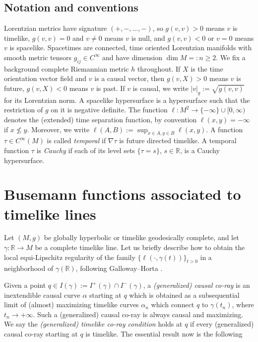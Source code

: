 \documentclass[a4paper,11pt]{article}
\numberwithin{equation}{section}
\theoremstyle{definition}
\theoremstyle{plain}
\newcommand{\R}{\mathbb R}
\begin{document}
\subsection{Notation and conventions}
\label{subsection: notation conventions}

Lorentzian metrics have signature $(+,-,\dots,-)$, so
$g(v,v) > 0$ means $v$ is timelike, $g(v,v) = 0$ and $v \neq 0$ means $v$ is null, and $g(v,v) < 0$ or $v = 0$ means $v$ is spacelike.
Spacetimes are connected, time oriented Lorentzian manifolds 
with smooth metric tensors $g_{ij} \in C^\infty$ 
and have dimension $\dim M =:n \geq 2$. 
We fix a background complete Riemannian metric $h$ throughout. If $X$ is the time orientation vector field and $v$ is a causal vector, then $g(v,X) > 0$ means $v$ is future, $g(v,X) < 0$ means $v$ is past. If $v$ is causal, we write $|v|_g:=\sqrt{g(v,v)}$ for its Lorentzian norm. A spacelike hypersurface is a hypersurface such that the restriction of $g$ on it is negative definite. The function $\ell:M^2 \to \{-\infty\} \cup [0,\infty)$ denotes the (extended) time separation function, by convention $\ell(x,y) = -\infty$ if $x \not \leq y$. Moreover, we write $\ell(A,B):=\sup_{x \in A, y\in B} \ell(x,y)$. A function $\tau \in C^\infty(M)$ is called \emph{temporal} if $\nabla \tau$ is future directed timelike. A temporal function $\tau$ is \emph{Cauchy} if each of its level sets $\{\tau = s\}$, $s \in \R$, is a Cauchy hypersurface.

\section{Busemann functions associated to timelike lines}
\label{Section: Proof of Bartnik}

Let $(M,g)$ be globally hyperbolic or timelike geodesically complete, and let $\gamma:\R \to M$ be a complete timelike line. Let us briefly describe how to obtain the local equi-Lipschitz regularity of the family $\{\ell(\cdot,\gamma(t))\}_{t > 0}$ in a neighborhood of $\gamma(\R)$, following Galloway--Horta \cite{GallowayHorta}.

Given a point $q \in I(\gamma):=I^+(\gamma) \cap I^-(\gamma)$, a \emph{(generalized) causal co-ray} is an inextendible causal curve $\alpha$ starting at $ q$ which is obtained as a subsequential limit of (almost) maximizing timelike curves $\alpha_n$ which connect $q$ to $\gamma(t_n)$, where $t_n \to +\infty$. Such a (generalized) causal co-ray is always causal and maximizing. We say the \emph{(generalized) timelike co-ray condition} holds at $q$ if every (generalized) causal co-ray starting at $q$ is timelike. The essential result now is the following
\end{document}
